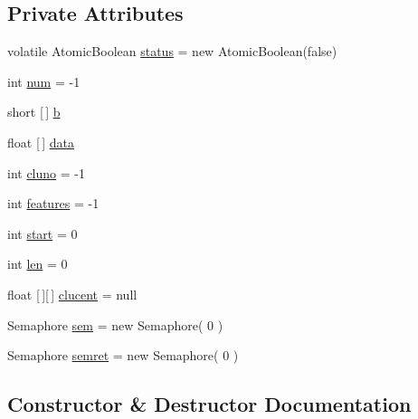 \subsection*{Private Attributes}
\begin{DoxyCompactItemize}
\item 
volatile Atomic\+Boolean \mbox{\hyperlink{classcom_1_1example_1_1dmocl_1_1kmeans_1_1kmeans__thread_a43516296d56b428832782a5b52475bec}{status}} = new Atomic\+Boolean(false)
\item 
int \mbox{\hyperlink{classcom_1_1example_1_1dmocl_1_1kmeans_1_1kmeans__thread_a7c5a94a9fe10aa2c30fdfa412dd063aa}{num}} = -\/1
\item 
short \mbox{[}$\,$\mbox{]} \mbox{\hyperlink{classcom_1_1example_1_1dmocl_1_1kmeans_1_1kmeans__thread_a70723446065bed203819235225d8872a}{b}}
\item 
float \mbox{[}$\,$\mbox{]} \mbox{\hyperlink{classcom_1_1example_1_1dmocl_1_1kmeans_1_1kmeans__thread_a43f4f667e4e1e3a8a5576b8dfe3e4470}{data}}
\item 
int \mbox{\hyperlink{classcom_1_1example_1_1dmocl_1_1kmeans_1_1kmeans__thread_a679f4f01536ffdfb0855fab1d8f73a76}{cluno}} = -\/1
\item 
int \mbox{\hyperlink{classcom_1_1example_1_1dmocl_1_1kmeans_1_1kmeans__thread_a70008d8c428171988cd60ff99f4155ac}{features}} = -\/1
\item 
int \mbox{\hyperlink{classcom_1_1example_1_1dmocl_1_1kmeans_1_1kmeans__thread_aed0c23150d7c6b6c7d4ed35b210b799f}{start}} = 0
\item 
int \mbox{\hyperlink{classcom_1_1example_1_1dmocl_1_1kmeans_1_1kmeans__thread_a7ed367dca687e507dec270455f128249}{len}} = 0
\item 
float \mbox{[}$\,$\mbox{]}\mbox{[}$\,$\mbox{]} \mbox{\hyperlink{classcom_1_1example_1_1dmocl_1_1kmeans_1_1kmeans__thread_a9dd4b0dd6effc56f5971076e6448c5ec}{clucent}} = null
\item 
Semaphore \mbox{\hyperlink{classcom_1_1example_1_1dmocl_1_1kmeans_1_1kmeans__thread_aef412ed6733efe48fcf5b629fa2839b3}{sem}} = new Semaphore( 0 )
\item 
Semaphore \mbox{\hyperlink{classcom_1_1example_1_1dmocl_1_1kmeans_1_1kmeans__thread_a0ccdc986d878544aa58e30b151fbad91}{semret}} = new Semaphore( 0 )
\end{DoxyCompactItemize}


\subsection{Constructor \& Destructor Documentation}
\mbox{\label{classcom_1_1example_1_1dmocl_1_1kmeans_1_1kmeans__thread_accf2b8063de142790863073f2d4fc02b}} 
